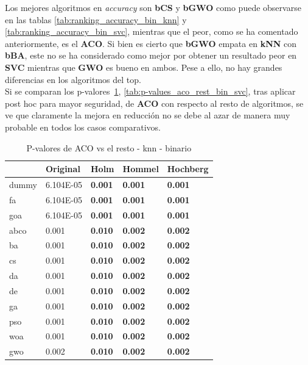 Los mejores algoritmos en \textit{accuracy} son \textbf{bCS} y \textbf{bGWO} como puede observarse en las tablas \ref{tab:ranking_accuracy_bin_knn} y \ref{tab:ranking_accuracy_bin_svc}, mientras que el peor, como se ha comentado anteriormente, es el \textbf{ACO}. Si bien es cierto que \textbf{bGWO} empata en \textbf{kNN} con \textbf{bBA}, este no se ha considerado como mejor por obtener un resultado peor en \textbf{SVC} mientras que \textbf{GWO} es bueno en ambos. Pese a ello, no hay grandes diferencias en los algoritmos del top.\\[6pt]

Si se comparan los p-valores~\ref{tab:p-values_aco_rest_bin_knn}, \ref{tab:p-values_aco_rest_bin_svc}, tras aplicar post hoc para mayor seguridad, de \textbf{ACO} con respecto al resto de algoritmos, se ve que claramente la mejora en reducción no se debe al azar de manera muy probable en todos los casos comparativos.

\begin{table}[htp]
    \centering
    \begin{tabular}{lllll}
        \toprule
        {}    & Original  & Holm           & Hommel         & Hochberg       \\
        \midrule
        dummy & 6.104E-05 & \textbf{0.001} & \textbf{0.001} & \textbf{0.001} \\
        fa    & 6.104E-05 & \textbf{0.001} & \textbf{0.001} & \textbf{0.001} \\
        goa   & 6.104E-05 & \textbf{0.001} & \textbf{0.001} & \textbf{0.001} \\
        abco  & 0.001     & \textbf{0.010} & \textbf{0.002} & \textbf{0.002} \\
        ba    & 0.001     & \textbf{0.010} & \textbf{0.002} & \textbf{0.002} \\
        cs    & 0.001     & \textbf{0.010} & \textbf{0.002} & \textbf{0.002} \\
        da    & 0.001     & \textbf{0.010} & \textbf{0.002} & \textbf{0.002} \\
        de    & 0.001     & \textbf{0.010} & \textbf{0.002} & \textbf{0.002} \\
        ga    & 0.001     & \textbf{0.010} & \textbf{0.002} & \textbf{0.002} \\
        pso   & 0.001     & \textbf{0.010} & \textbf{0.002} & \textbf{0.002} \\
        woa   & 0.001     & \textbf{0.010} & \textbf{0.002} & \textbf{0.002} \\
        gwo   & 0.002     & \textbf{0.010} & \textbf{0.002} & \textbf{0.002} \\
        \bottomrule
    \end{tabular}
    \caption{P-valores de ACO vs el resto - knn - binario}
    \label{tab:p-values_aco_rest_bin_knn}
\end{table}

